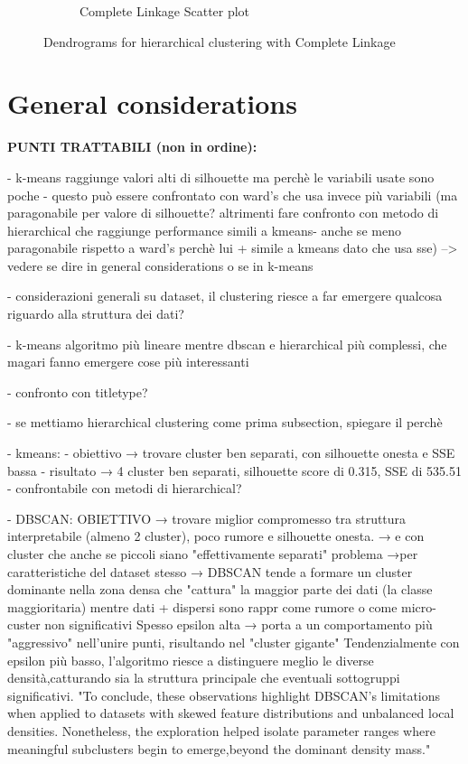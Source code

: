 \begin{figure}[H]
\begin{subfigure}[b]{0.49\textwidth}
        \caption{Complete Linkage Scatter plot}
        \label{fig:pairplot_ward_5}
    \end{subfigure}
    \caption{Dendrograms for hierarchical clustering with Complete Linkage}
    \label{fig:dendrograms_complete}
\end{figure}

\section{General considerations}\label{sec:considerations}
\textbf{PUNTI TRATTABILI (non in ordine):}

- k-means raggiunge valori alti di silhouette ma perchè le variabili usate sono poche - questo può essere
confrontato con ward's che usa invece più variabili (ma paragonabile per valore di silhouette? altrimenti fare confronto con metodo di hierarchical
che raggiunge performance simili a kmeans- anche se meno paragonabile rispetto a ward's perchè lui + simile a kmeans dato che usa sse)
--> vedere se dire in general considerations o se in k-means

- considerazioni generali su dataset, il clustering riesce a far emergere qualcosa riguardo alla struttura dei dati?

- k-means algoritmo più lineare mentre dbscan e hierarchical più complessi, che magari fanno emergere cose più interessanti

- confronto con titletype?

- se mettiamo hierarchical clustering come prima subsection, spiegare il perchè

- kmeans:
    - obiettivo → trovare cluster ben separati, con silhouette onesta e SSE bassa
    - risultato → 4 cluster ben separati, silhouette score di 0.315, SSE di 535.51
    - confrontabile con metodi di hierarchical?

- DBSCAN:
        OBIETTIVO → trovare miglior compromesso tra struttura interpretabile (almeno 2 cluster), poco rumore e silhouette onesta.  
        → e con cluster che anche se piccoli siano "effettivamente separati" 
        problema →per caratteristiche del dataset stesso → DBSCAN tende a formare un cluster dominante nella zona densa che "cattura" la maggior parte dei dati 
        (la classe maggioritaria) mentre dati + dispersi sono rappr come rumore o come micro-custer non significativi
        Spesso epsilon alta →  porta a un comportamento più "aggressivo" nell'unire punti, risultando nel "cluster gigante" 
        Tendenzialmente con epsilon più basso, l'algoritmo riesce a distinguere meglio le diverse densità,catturando sia la struttura principale che 
        eventuali sottogruppi significativi.
        "To conclude, these observations highlight DBSCAN's limitations when applied to datasets with skewed feature
        distributions and unbalanced local densities. Nonetheless, the exploration helped isolate parameter ranges where
        meaningful subclusters begin to emerge,beyond the dominant density mass."

